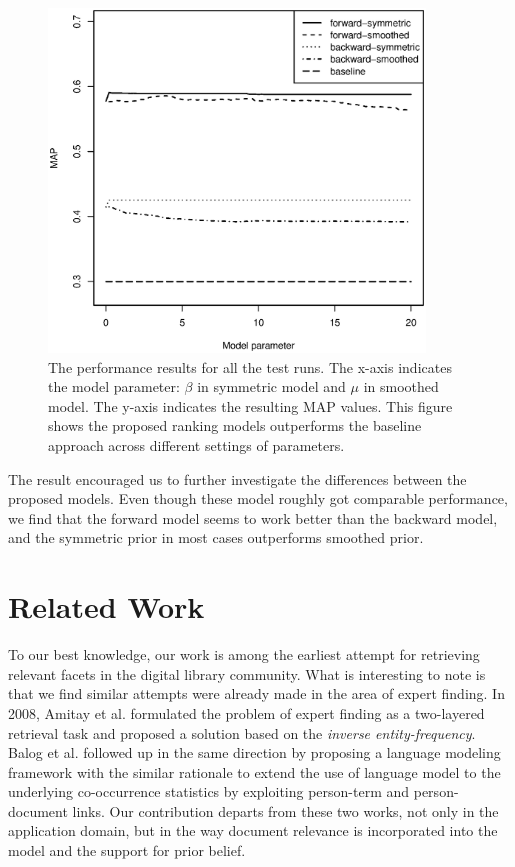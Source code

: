\begin{figure}[ht!]
  \centering
  \includegraphics[width=10cm]{performance.eps}
  \caption{The performance results for all the test runs.  The x-axis indicates the model parameter: $\beta$ in symmetric model and $\mu$ in smoothed model.  The y-axis indicates the resulting MAP values.  This figure shows the proposed ranking models outperforms the baseline approach across different settings of parameters.}
  \label{f:performance}
\end{figure}

The result encouraged us to further investigate the differences between the
proposed models.  Even though these model roughly got comparable performance, we
find that the forward model seems to work better than the backward model, and
the symmetric prior in most cases outperforms smoothed prior. 

\section{Related Work}\label{s:related-work}


To our best knowledge, our work is among the earliest attempt for retrieving
relevant facets in the digital library community.  What is interesting to note
is that we find similar attempts were already made in the area of expert
finding.  In 2008, Amitay et al. \cite{amitay2008finding} formulated the
problem of expert finding as a two-layered retrieval task and proposed a
solution based on the \emph{inverse entity-frequency}.  Balog et al.
\cite{balog2009language} followed up in the same direction by proposing a
language modeling framework with the similar rationale to extend the use of
language model to the underlying co-occurrence statistics by exploiting
person-term and person-document links.  Our contribution departs from these two
works, not only in the application domain, but in the way document relevance is
incorporated into the model and the support for prior belief.  
 
